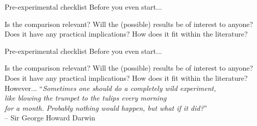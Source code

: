 \documentclass[t]{beamer}
\begin{document}

\begin{ftst}
{Pre-experimental checklist}
{Before you even start...}
%
Is the comparison relevant?
\vone
Will the (possible) results be of interest to anyone?
\vone 
Does it have any practical implications?
\vone 
How does it fit within the literature?
\vone\vone\vone
\end{ftst}


\begin{ftst}
{Pre-experimental checklist}
{Before you even start...}
%
Is the comparison relevant?
\vone
Will the (possible) results be of interest to anyone?
\vone 
Does it have any practical implications?
\vone 
How does it fit within the literature?
\vone\vone\vone
However...
\vhalf
{\scriptsize``\textit{Sometimes one should do a completely wild experiment,\\like blowing the trumpet to the tulips every morning\\for a month. Probably nothing would happen, but what if it did?}''\\}
{\tiny -- Sir George Howard Darwin}
%
\end{ftst}

\end{document}
